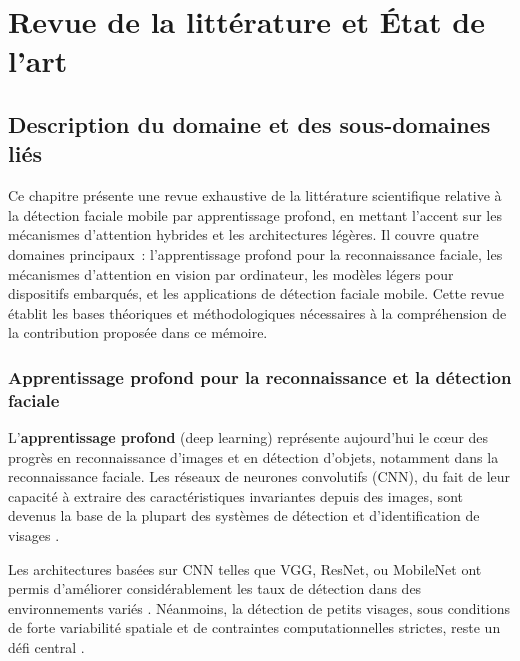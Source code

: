 \chapter{Revue de la littérature et État de l'art}
\begin{onehalfspace}

\section{Description du domaine et des sous-domaines liés}

\hspace{0.65 cm}Ce chapitre présente une revue exhaustive de la littérature scientifique relative à la détection faciale mobile par apprentissage profond, en mettant l'accent sur les mécanismes d'attention hybrides et les architectures légères. Il couvre quatre domaines principaux~: l'apprentissage profond pour la reconnaissance faciale, les mécanismes d'attention en vision par ordinateur, les modèles légers pour dispositifs embarqués, et les applications de détection faciale mobile. Cette revue établit les bases théoriques et méthodologiques nécessaires à la compréhension de la contribution proposée dans ce mémoire.

\subsection{Apprentissage profond pour la reconnaissance et la détection faciale}

\hspace{0.65 cm}L'\textbf{apprentissage profond} (deep learning) représente aujourd'hui le cœur des progrès en reconnaissance d'images et en détection d'objets, notamment dans la reconnaissance faciale. Les réseaux de neurones convolutifs (CNN), du fait de leur capacité à extraire des caractéristiques invariantes depuis des images, sont devenus la base de la plupart des systèmes de détection et d'identification de visages \cite{LeCun2015DeepLearning}.

\hspace{0.65 cm}Les architectures basées sur CNN telles que VGG, ResNet, ou MobileNet ont permis d'améliorer considérablement les taux de détection dans des environnements variés \cite{He2016ResNet, Sandler2018MobileNetV2}. Néanmoins, la détection de petits visages, sous conditions de forte variabilité spatiale et de contraintes computationnelles strictes, reste un défi central \cite{Zhang2019BlazeFace, Kim2025FeatherFace}.


\end{onehalfspace}
